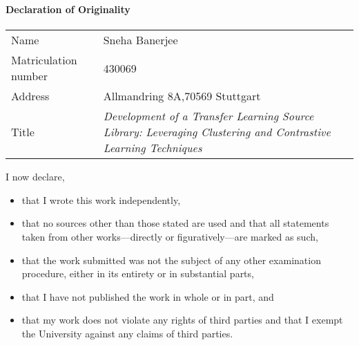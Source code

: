 
\begin{titlepage}

\Large\textbf{Declaration of Originality}
\paragraph{}
    \begin{tabular}{p{1.8in}p{4.5in}}
        Name & Sneha Banerjee \\
        Matriculation number & 430069 \\
        Address & Allmandring 8A,70569 Stuttgart \\        
        Title & \textit{Development of a Transfer Learning Source Library: Leveraging Clustering and Contrastive Learning Techniques} \\
    \end{tabular}

\vspace{1cm}
I now declare,
\begin{itemize}
    \item that I wrote this work independently,
    \item that no sources other than those stated are used and that all statements taken from
other works—directly or figuratively—are marked as such,
    \item that the work submitted was not the subject of any other examination procedure,
either in its entirety or in substantial parts,
    \item that I have not published the work in whole or in part, and
    \item that my work does not violate any rights of third parties and that I exempt the
University against any claims of third parties.
    \end{itemize} 
\end{titlepage}